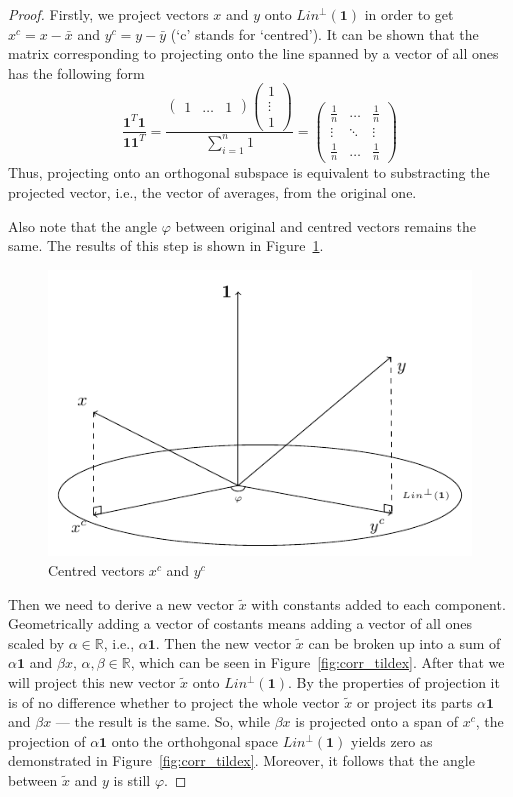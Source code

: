 \documentclass[nobib]{tufte-handout}
\theoremstyle{definition}
\begin{document}
\begin{proof}
Firstly, we project vectors $x$ and $y$ onto $Lin^{\perp}(\mathbf{1})$ in order to get $x^c = x - \bar x$ and $y^c = y - \bar y$
(`c' stands for `centred'). It can be shown that the matrix corresponding to projecting onto the line spanned by a vector of all ones has the following form
\[
\frac{\mathbf{1}^T \mathbf{1}}{\mathbf{1} \mathbf{1}^T} = \frac{\begin{pmatrix} 1 & \ldots & 1 \end{pmatrix} \begin{pmatrix} 1 \\ \vdots \\ 1 \end{pmatrix}}{\sum_{i=1}^n 1} = \begin{pmatrix} \frac{1}{n} & \ldots & \frac{1}{n} \\ \vdots & \ddots & \vdots \\ \frac{1}{n} & \ldots & \frac{1}{n} \end{pmatrix}
\]
Thus, projecting onto an orthogonal subspace is equivalent to substracting the projected vector, i.e., the vector of averages, from the original one.

Also note that the angle $\varphi$ between original and centred vectors remains the same.
The results of this step is shown in Figure~\ref{fig:corr_xyc}.

\begin{figure}[h!]
  \centering
  \includegraphics[width=0.45\linewidth]{images/corr_const_cent.pdf}
  \caption{Centred vectors $x^c$ and $y^c$}
  \label{fig:corr_xyc}
\end{figure}

Then we need to derive a new vector $\tilde x$ with constants added to each component.
Geometrically adding a vector of costants means adding a vector of all ones
scaled by $\alpha \in \mathbb{R}$, i.e., $\alpha \mathbf{1}$.
Then the new vector $\tilde x$ can be broken up into a sum of $\alpha \mathbf{1}$ and
$\beta x$, $\alpha, \beta \in \mathbb{R}$, which can be seen in Figure~\ref{fig:corr_tildex}.
After that we will project this new vector $\tilde x$ onto $Lin^{\perp}(\mathbf{1})$.
By the properties of projection it is of no difference whether to project
the whole vector $\tilde x$ or project its parts $\alpha \mathbf{1}$
and $\beta x$ — the result is the same.
So, while $\beta x$ is projected onto a span of $x^c$, the projection of $\alpha \mathbf{1}$
onto the orthohgonal space $Lin^{\perp}(\mathbf{1})$ yields zero as demonstrated
in Figure~\ref{fig:corr_tildex}.
Moreover, it follows that the angle between $\tilde x$ and $y$ is still $\varphi$.


\end{proof}
\end{document}
